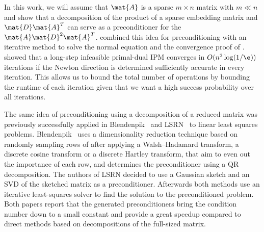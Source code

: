 In this work, we will assume that \(\mat{A}\) is a sparse \(m \times n\) matrix with \(m \ll n\) and show that a decomposition of the product of a sparse embedding matrix and \(\mat{D}\mat{A}^T\) can serve as a preconditioner for the \(\mat{A}\mat{D}^2\mat{A}^T\).
\Textcite{Avron-FasterRandomizedInfeasibleIPMs} combined this idea for preconditioning with an iterative method to solve the normal equation and the convergence proof of \textcite{Monteiro-ConvergenceAnalysisLongStepInfeasibleIPMs}.
\Textcite{Monteiro-ConvergenceAnalysisLongStepInfeasibleIPMs} showed that a long-step infeasible primal-dual IPM converges in \(O(n^2 \log(1/\e))\) iterations if the Newton direction is determined sufficiently accurate in every iteration.
This allows us to bound the total number of operations by bounding the runtime of each iteration given that we want a high success probability over all iterations.

The same idea of preconditioning using a decomposition of a reduced matrix was previously successfully applied in Blendenpik~\cite{Avron-Blendenpik} and LSRN~\cite{MengSaundersMahoney-LSRN} to linear least squares problems.
Blendenpik~\cite{Avron-Blendenpik} uses a dimensionality reduction technique based on randomly sampling rows of after applying a Walsh--Hadamard transform, a discrete cosine transform or a discrete Hartley transform, that aim to even out the importance of each row, and determines the preconditioner using a QR decomposition.
The authors of LSRN \textcite{MengSaundersMahoney-LSRN} decided to use a Gaussian sketch and an SVD of the sketched matrix as a preconditioner.
Afterwards both methods use an iterative least-squares solver to find the solution to the preconditioned problem.
Both papers report that the generated preconditioners bring the condition number down to a small constant and provide a great speedup compared to direct methods based on decompositions of the full-sized matrix.


